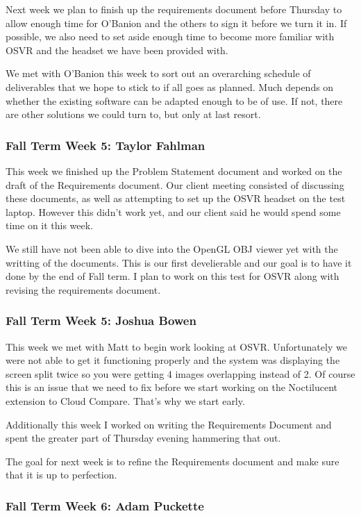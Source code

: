 \documentclass[draftclsnofoot,onecolumn]{IEEEtran}
\begin{document}
Next week we plan to finish up the requirements document before Thursday to allow enough time for O'Banion and the others to sign it before we turn it in. If possible, we also need to set aside enough time to become more familiar with OSVR and the headset we have been provided with.

We met with O'Banion this week to sort out an overarching schedule of deliverables that we hope to stick to if all goes as planned. Much depends on whether the existing software can be adapted enough to be of use. If not, there are other solutions we could turn to, but only at last resort.

\subsubsection{Fall Term Week 5: Taylor Fahlman}

This week we finished up the Problem Statement document and worked on the draft of the Requirements document. Our client meeting consisted of discussing these documents, as well as attempting to set up the OSVR headset on the test laptop. However this didn't work yet, and our client said he would spend some time on it this week.

We still have not been able to dive into the OpenGL OBJ viewer yet with the writting of the documents. This is our first develierable and our goal is to have it done by the end of Fall term. I plan to work on this test for OSVR along with revising the requirements document.

\subsubsection{Fall Term Week 5: Joshua Bowen}

This week we met with Matt to begin work looking at OSVR. Unfortunately we were not able to get it functioning properly and the system was displaying the screen split twice so you were getting 4 images overlapping instead of 2. Of course this is an issue that we need to fix before we start working on the Noctilucent extension to Cloud Compare. That's why we start early.

Additionally this week I worked on writing the Requirements Document and spent the greater part of Thursday evening hammering that out.

The goal for next week is to refine the Requirements document and make sure that it is up to perfection.

\subsubsection{Fall Term Week 6: Adam Puckette}
\end{document}
